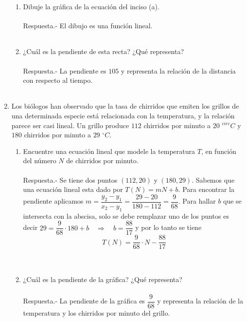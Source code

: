 \begin{enumerate}
\begin{enumerate}[\bfseries (a)]
	\item Dibuje la gráfica de la ecuación del inciso (a).\\\\
	    Respuesta.-\; El dibujo es una función lineal.\\\\

	\item ¿Cuál es la pendiente de esta recta? ¿Qué representa?\\\\
	    Respuesta.-\; La pendiente es $105$ y representa la relación de la distancia con respecto al tiempo.\\\\
    
    \end{enumerate}

\item Los biólogos han observado que la tasa de chirridos que emiten los grillos de una determinada especie está relacionada con la temperatura, y la relación parece ser casi lineal. Un grillo produce $112$ chirridos por minuto a $20$ $^{circ}C$ y $180$ chirridos por minuto a $29$ $^{\circ}C$.
    \begin{enumerate}[\bfseries (a)]

	\item Encuentre una ecuación lineal que modele la temperatura $T$, en función del número $N$ de chirridos por minuto.\\\\
	    Respuesta.-\; Se tiene dos puntos $(112,20)$ y $(180,29)$. Sabemos que una ecuación lineal esta dado por $T(N)=mN + b$. Para encontrar la pendiente aplicamos $m=\dfrac{y_2-y_1}{x_2-y_1}=\dfrac{29-20}{180-112}=\dfrac{9}{68}$. Para hallar $b$ que se  intersecta con la abscisa, solo se debe remplazar uno de los puntos es decir $29=\dfrac{9}{68}\cdot 180 + b \quad \Rightarrow \quad b=\dfrac{88}{17}$ y por lo tanto se tiene $$T(N)=\dfrac{9}{68}\cdot N - \dfrac{88}{17}$$ \\\\
	
	\item ¿Cuál es la pendiente de la gráfica? ¿Qué representa?\\\\
	    Respuesta.-\; La pendiente de la gráfica es $\dfrac{9}{68}$ y representa la relación de la temperatura y los chirridos por minuto del grillo.\\\\
	

\end{enumerate}
\end{enumerate}
